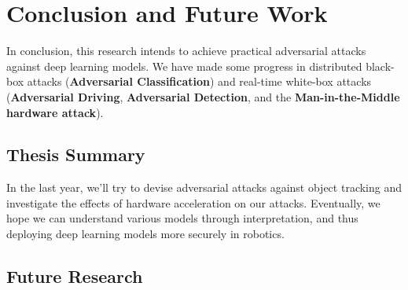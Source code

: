 \chapter{Conclusion and Future Work}

In conclusion, this research intends to achieve practical adversarial attacks against deep learning models. We have made some progress in distributed black-box attacks (\textbf{Adversarial Classification}) and real-time white-box attacks (\textbf{Adversarial Driving}, \textbf{Adversarial Detection}, and the \textbf{Man-in-the-Middle hardware attack}).

\section{Thesis Summary}

In the last year, we'll try to devise adversarial attacks against object tracking and investigate the effects of hardware acceleration on our attacks. Eventually, we hope we can understand various models through interpretation, and thus deploying deep learning models more securely in robotics.

\section{Future Research}
